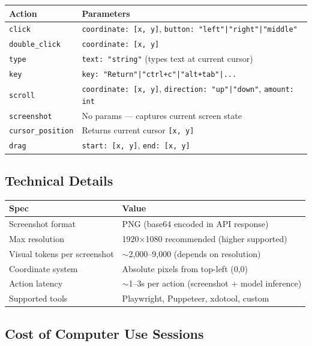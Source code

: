 \documentclass[11pt,a4paper]{article}
\begin{document}
\begin{center}
\begin{tabular}{lL{9cm}}
\toprule
\textbf{Action} & \textbf{Parameters} \\
\midrule
\texttt{click} & \texttt{coordinate: [x, y]}, \texttt{button: "left"|"right"|"middle"} \\
\texttt{double\_click} & \texttt{coordinate: [x, y]} \\
\texttt{type} & \texttt{text: "string"} (types text at current cursor) \\
\texttt{key} & \texttt{key: "Return"|"ctrl+c"|"alt+tab"|...} \\
\texttt{scroll} & \texttt{coordinate: [x, y]}, \texttt{direction: "up"|"down"}, \texttt{amount: int} \\
\texttt{screenshot} & No params --- captures current screen state \\
\texttt{cursor\_position} & Returns current cursor \texttt{[x, y]} \\
\texttt{drag} & \texttt{start: [x, y]}, \texttt{end: [x, y]} \\
\bottomrule
\end{tabular}
\end{center}

\subsection{Technical Details}

\begin{center}
\begin{tabular}{ll}
\toprule
\textbf{Spec} & \textbf{Value} \\
\midrule
Screenshot format & PNG (base64 encoded in API response) \\
Max resolution & 1920$\times$1080 recommended (higher supported) \\
Visual tokens per screenshot & $\sim$2,000--9,000 (depends on resolution) \\
Coordinate system & Absolute pixels from top-left (0,0) \\
Action latency & $\sim$1--3s per action (screenshot + model inference) \\
Supported tools & Playwright, Puppeteer, xdotool, custom \\
\bottomrule
\end{tabular}
\end{center}

\subsection{Cost of Computer Use Sessions}
\end{document}
